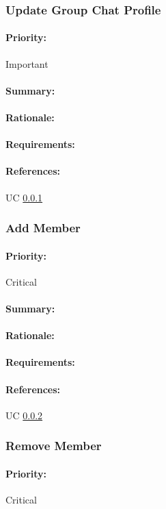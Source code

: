 \documentclass[11pt]{article}
\begin{document}
\subsubsection{Update Group Chat Profile} \label{FR-update-group}
\paragraph{Priority:}Important
\paragraph{Summary:}
\paragraph{Rationale:}
\paragraph{Requirements:}
\paragraph{References:} UC \ref{FR-update-group}
\subsubsection{Add Member} \label{FR-add-member}
\paragraph{Priority:}Critical
\paragraph{Summary:}
\paragraph{Rationale:}
\paragraph{Requirements:}
\paragraph{References:} UC \ref{FR-add-member}
\subsubsection{Remove Member} \label{FR-remove-member}
\paragraph{Priority:}Critical
\end{document}
